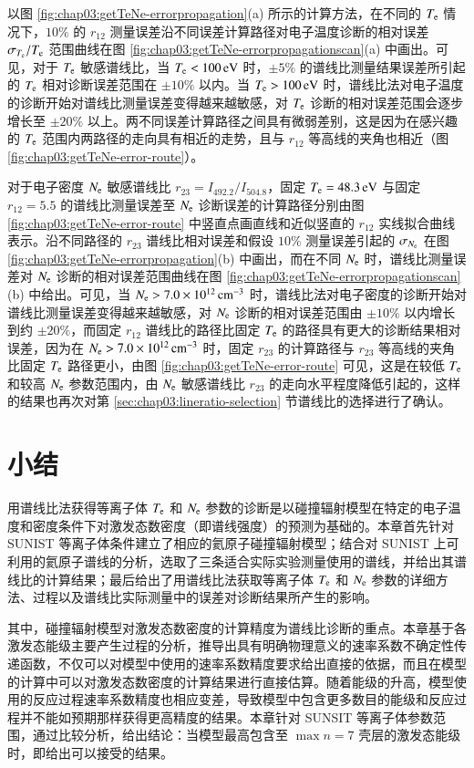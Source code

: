以图 \ref{fig:chap03:getTeNe-errorpropagation}(a) 所示的计算方法，在不同的 $T_{\rm e}$ 情况下，$10\%$ 的 $r_{12}$ 测量误差沿不同误差计算路径对电子温度诊断的相对误差 $\sigma_{T_{\rm e}}/T_{\rm e}$ 范围曲线在图 \ref{fig:chap03:getTeNe-errorpropagationscan}(a) 中画出。可见，对于 $T_{\rm e}$ 敏感谱线比，当 $T_{\rm e}<100\,{\rm eV}$ 时，$\pm5\%$ 的谱线比测量结果误差所引起的 $T_{\rm e}$ 相对诊断误差范围在 $\pm10\%$ 以内。当 $T_{\rm e}>100\,{\rm eV}$ 时，谱线比法对电子温度的诊断开始对谱线比测量误差变得越来越敏感，对 $T_{\rm e}$ 诊断的相对误差范围会逐步增长至 $\pm20\%$ 以上。两不同误差计算路径之间具有微弱差别，这是因为在感兴趣的 $T_{\rm e}$ 范围内两路径的走向具有相近的走势，且与 $r_{12}$ 等高线的夹角也相近（图 \ref{fig:chap03:getTeNe-error-route}）。

对于电子密度 $N_{\rm e}$ 敏感谱线比 $r_{23}=I_{492.2}/I_{504.8}$，固定 $T_{\rm e}=48.3\,{\rm eV}$ 与固定 $r_{12}=5.5$ 的谱线比测量误差至 $N_{\rm e}$ 诊断误差的计算路径分别由图 \ref{fig:chap03:getTeNe-error-route} 中竖直点画直线和近似竖直的 $r_{12}$ 实线拟合曲线表示。沿不同路径的 $r_{23}$ 谱线比相对误差和假设 $10\%$ 测量误差引起的 $\sigma_{N_{\rm e}}$ 在图 \ref{fig:chap03:getTeNe-errorpropagation}(b) 中画出，而在不同 $N_{\rm e}$ 时，谱线比测量误差对 $N_{\rm e}$ 诊断的相对误差范围曲线在图 \ref{fig:chap03:getTeNe-errorpropagationscan}(b) 中给出。可见，当 $N_{\rm e}>7.0\times10^{12}\,{\rm cm}^{-3}$ 时，谱线比法对电子密度的诊断开始对谱线比测量误差变得越来越敏感，对 $N_{\rm e}$ 诊断的相对误差范围由 $\pm10\%$ 以内增长到约 $\pm20\%$，而固定 $r_{12}$ 谱线比的路径比固定 $T_{\rm e}$ 的路径具有更大的诊断结果相对误差，因为在 $N_{\rm e}>7.0\times10^{12}\,{\rm cm}^{-3}$ 时，固定 $r_{23}$ 的计算路径与 $r_{23}$ 等高线的夹角比固定 $T_{\rm e}$ 路径更小，由图 \ref{fig:chap03:getTeNe-error-route} 可见，这是在较低 $T_{\rm e}$ 和较高 $N_{\rm e}$ 参数范围内，由 $N_{\rm e}$ 敏感谱线比 $r_{23}$ 的走向水平程度降低引起的，这样的结果也再次对第 \ref{sec:chap03:lineratio-selection} 节谱线比的选择进行了确认。

\section{小结}

用谱线比法获得等离子体 $T_{\rm e}$ 和 $N_{\rm e}$ 参数的诊断是以碰撞辐射模型在特定的电子温度和密度条件下对激发态数密度（即谱线强度）的预测为基础的。本章首先针对 SUNIST 等离子体条件建立了相应的氦原子碰撞辐射模型；结合对 SUNIST 上可利用的氦原子谱线的分析，选取了三条适合实际实验测量使用的谱线，并给出其谱线比的计算结果；最后给出了用谱线比法获取等离子体 $T_{\rm e}$ 和 $N_{\rm e}$ 参数的详细方法、过程以及谱线比实际测量中的误差对诊断结果所产生的影响。

其中，碰撞辐射模型对激发态数密度的计算精度为谱线比诊断的重点。本章基于各激发态能级主要产生过程的分析，推导出具有明确物理意义的速率系数不确定性传递函数，不仅可以对模型中使用的速率系数精度要求给出直接的依据，而且在模型的计算中可以对激发态数密度的计算结果进行直接估算。随着能级的升高，模型使用的反应过程速率系数精度也相应变差，导致模型中包含更多数目的能级和反应过程并不能如预期那样获得更高精度的结果。本章针对 SUNSIT 等离子体参数范围，通过比较分析，给出结论：当模型最高包含至 $\max n=7$ 壳层的激发态能级时，即给出可以接受的结果。

